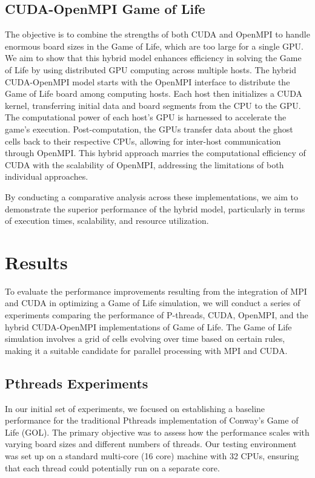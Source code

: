 \documentclass[11pt,twocolumn]{article}
\begin{document}
\subsection{CUDA-OpenMPI Game of Life} The objective is to combine the strengths of both CUDA and OpenMPI to handle enormous board sizes in the Game of Life, which are too large for a single GPU. We aim to show that this hybrid model enhances efficiency in solving the Game of Life by using distributed GPU computing across multiple hosts. The hybrid CUDA-OpenMPI model starts with the OpenMPI interface to distribute the Game of Life board among computing hosts. Each host then initializes a CUDA kernel, transferring initial data and board segments from the CPU to the GPU. The computational power of each host's GPU is harnessed to accelerate the game's execution. Post-computation, the GPUs transfer data about the ghost cells back to their respective CPUs, allowing for inter-host communication through OpenMPI. This hybrid approach marries the computational efficiency of CUDA with the scalability of OpenMPI, addressing the limitations of both individual approaches.

By conducting a comparative analysis across these implementations, we aim to demonstrate the superior performance of the hybrid model, particularly in terms of execution times, scalability, and resource utilization.

\section {Results}\label{results} To evaluate the performance improvements resulting from the integration of MPI and CUDA in optimizing a Game of Life simulation, we will conduct a series of experiments comparing the performance of P-threads, CUDA, OpenMPI, and the hybrid CUDA-OpenMPI implementations of Game of Life. The Game of Life simulation involves a grid of cells evolving over time based on certain rules, making it a suitable candidate for parallel processing with MPI and CUDA.

\subsection{Pthreads Experiments}

In our initial set of experiments, we focused on establishing a baseline performance for the traditional Pthreads implementation of Conway's Game of Life (GOL). The primary objective was to assess how the performance scales with varying board sizes and different numbers of threads. Our testing environment was set up on a standard multi-core (16 core) machine with 32 CPUs, ensuring that each thread could potentially run on a separate core.
\end{document}
